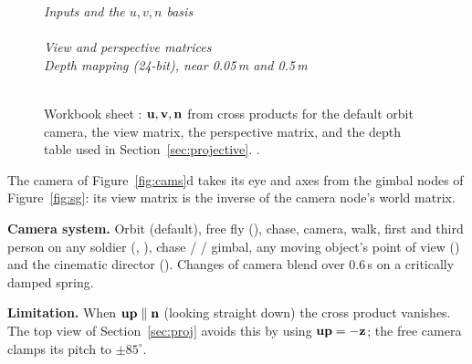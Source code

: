 \begin{figure}[htbp]
\centering
{\footnotesize\textit{Inputs and the $u,v,n$ basis}}\\[0.5mm]
\\[1mm]
{\footnotesize\textit{View and perspective matrices}}\\[0.5mm]
{\footnotesize\textit{Depth mapping (24-bit), near 0.05\,m and 0.5\,m}}\\[0.5mm]
\\[1mm]
{\footnotesize\wbkey}
\caption{Workbook sheet : $\mathbf{u},\mathbf{v},\mathbf{n}$ from cross products for the default orbit
camera, the view matrix, the perspective matrix, and the depth table used in Section~\ref{sec:projective}. .}
\label{fig:wb-view}
\end{figure}

The  camera of Figure~\ref{fig:cams}d takes its eye and axes from the gimbal nodes of Figure~\ref{fig:sg}: its
view matrix is the inverse of the camera node's world matrix.

\textbf{Camera system.} Orbit (default), free fly (), chase,  camera, walk, first and third person on
any soldier (, ),  chase /  / gimbal, any moving object's point of view () and the
cinematic director (). Changes of camera blend over 0.6\,s on a critically damped spring.

\textbf{Limitation.} When $\mathbf{up}\parallel\mathbf{n}$ (looking straight down) the cross product vanishes. The top view of
Section~\ref{sec:proj} avoids this by using $\mathbf{up}=-\mathbf{z}$; the free camera clamps its pitch to $\pm85^\circ$.
